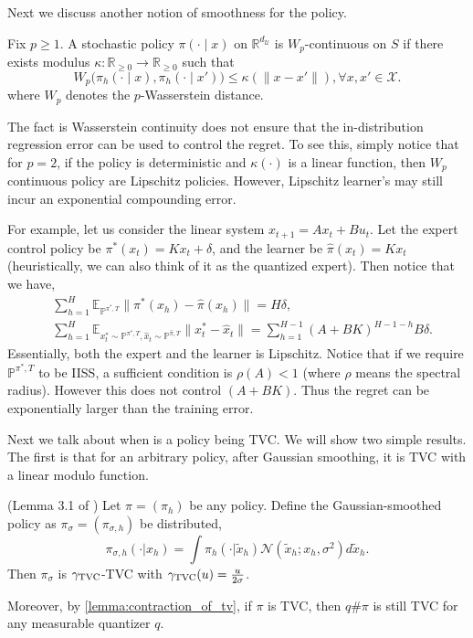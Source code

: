 \documentclass{article}
\begin{document}
Next we discuss another notion of smoothness for the policy.

\begin{definition}[$W_p$-continuity]
Fix $p\ge1$. A stochastic policy $\pi(\cdot\mid x)$ on $\mathbb R^{d_\mathcal U}$ is $W_p$-continuous on $S$ if there exists modulus $\kappa:\mathbb R_{\geq 0}\to\mathbb R_{\geq0}$ such that
\begin{equation*}
W_p\big(\pi_h(\cdot\mid x),\pi_h(\cdot\mid x')\big)\le \kappa(\|x-x'\|),\forall x,x'\in \mathcal X.
\end{equation*}
where $W_p$ denotes the $p$-Wasserstein distance.
\end{definition}

The fact is Wasserstein continuity does not ensure that the in-distribution regression error can be used to control the regret. To see this, simply notice that for $p=2$, if the policy is deterministic and $\kappa(\cdot)$ is a linear function, then $W_p$ continuous policy are Lipschitz policies.  However, Lipschitz learner's may still incur an exponential compounding error. 

For example, let us consider the linear system $x_{t+1}=Ax_t+Bu_t$. Let the expert control policy be $\pi^*(x_t)=Kx_t+\delta$, and the learner be $\hat \pi(x_t)=K x_t$ (heuristically, we can also think of it as the quantized expert). Then notice that we have,
\begin{align*}
    &\sum_{h=1}^H\mathbb E_{\mathbb P^{\pi^*, T}}\|\pi^*(x_h)-\hat \pi(x_h)\|=H\delta,\\
    &\sum_{h=1}^H \mathbb E_{x_t^*\sim \mathbb P^{\pi^*, T}, \hat x_t\sim \mathbb P^{\hat \pi, T}}\|x_t^*-\hat x_t\|=\sum_{h=1}^{H-1} (A+BK)^{H-1-h}B\delta.
\end{align*}
Essentially, both the expert and the learner is Lipschitz. Notice that if we require $\mathbb P^{\pi^*, T}$ to be IISS, a sufficient condition is $\rho(A)<1$ (where $\rho$ means the spectral radius). However this does not control $(A+BK)$. Thus the regret can be exponentially larger than the training error.




Next we talk about when is a policy being TVC. We will show two simple results. The first is that for an arbitrary policy, after Gaussian smoothing, it is TVC with a linear modulo function.

\begin{proposition}\textnormal{(Lemma 3.1 of \citep{block2023provable})} Let $\pi=(\pi_h)$ be any policy. Define the Gaussian-smoothed policy as $\pi_{\sigma}=(\pi_{\sigma,h})$ be distributed,
\begin{equation*}
    \pi_{\sigma,h}(\cdot|x_h)=\int \pi_{h}(\cdot|\tilde x_h) \mathcal N(\tilde x_h; x_h, \sigma^2)d\tilde x_h.
\end{equation*}
Then $\pi_{\sigma}$ is $\gamma_{\textnormal{TVC}}$-TVC with $\gamma_{\textnormal{TVC}}(u)=\frac{u}{2\sigma}$.
\end{proposition}
Moreover, by \cref{lemma:contraction_of_tv}, if $\pi$ is TVC, then $q\#\pi$ is still TVC for any measurable quantizer $q$. 
\end{document}
